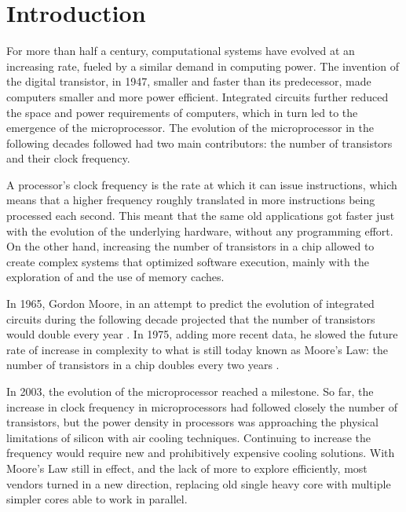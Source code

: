 \documentclass[../thesis]{subfiles}
\begin{document}
	\chapter{Introduction}
	\label{chp:intro}

	For more than half a century, computational systems have evolved at an increasing rate, fueled by a similar demand in computing power. The invention of the digital transistor, in 1947, smaller and faster than its predecessor, made computers smaller and more power efficient. Integrated circuits further reduced the space and power requirements of computers, which in turn led to the emergence of the microprocessor. The evolution of the microprocessor in the following decades followed had two main contributors: the number of transistors and their clock frequency.

	A processor's clock frequency is the rate at which it can issue instructions, which means that a higher frequency roughly translated in more instructions being processed each second. This meant that the same old applications got faster just with the evolution of the underlying hardware, without any programming effort. On the other hand, increasing the number of transistors in a chip allowed to create complex systems that optimized software execution, mainly with the exploration of \ilp and the use of memory caches.

	In 1965, Gordon Moore, in an attempt to predict the evolution of integrated circuits during the following decade projected that the number of transistors would double every year \cite{Moore:1965}. In 1975, adding more recent data, he slowed the future rate of increase in complexity to what is still today known as Moore's Law: the number of transistors in a chip doubles every two years \cite{Moore:1975,ComputerHistory:Moore}.

	In 2003, the evolution of the microprocessor reached a milestone. So far, the increase in clock frequency in microprocessors had followed closely the number of transistors, but the power density in processors was approaching the physical limitations of silicon with air cooling techniques. Continuing to increase the frequency would require new and prohibitively expensive cooling solutions. With Moore's Law still in effect, and the lack of more \ilp to explore efficiently, most vendors turned in a new direction, replacing old single heavy core \cpus with multiple simpler cores able to work in parallel.
\end{document}
